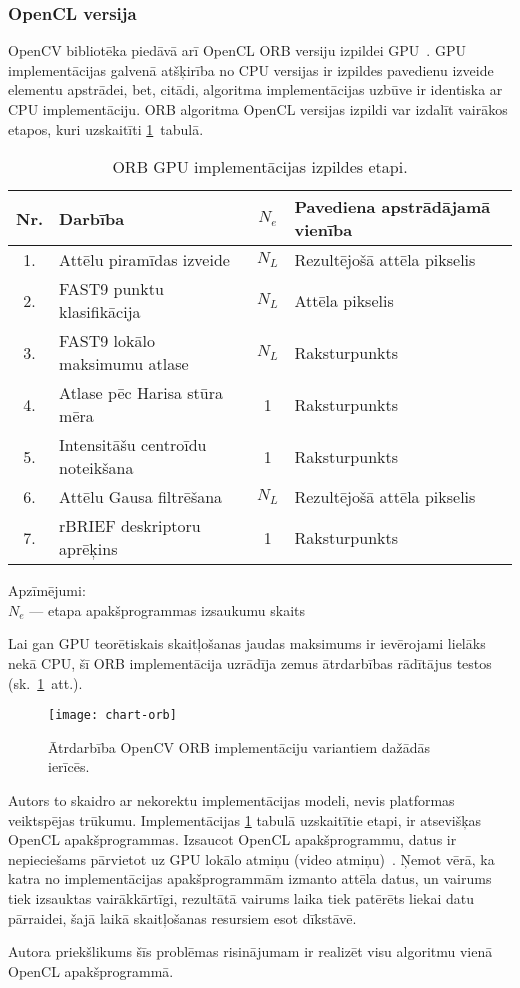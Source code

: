 \subsubsection{OpenCL versija}
\label{sec:orb-ocv-cl}
OpenCV bibliotēka piedāvā arī OpenCL ORB versiju izpildei
GPU~\cite{OpenCV-src}. GPU implementācijas galvenā atšķirība no CPU versijas 
ir izpildes pavedienu izveide elementu apstrādei, bet, citādi,
algoritma implementācijas uzbūve ir identiska ar CPU implementāciju.
ORB algoritma OpenCL versijas izpildi var izdalīt vairākos etapos, kuri
uzskaitīti \ref{tbl:orb-ocl-steps}~tabulā.
\begin{table}[thb]\small
	\centering
	\caption{ORB GPU implementācijas izpildes etapi.}
	\label{tbl:orb-ocl-steps}
	\vspace{4pt}
	\begin{tabular}{clcl}
		\toprule
		\textbf{Nr.} & \textbf{Darbība} & $N_e$ & \textbf{Pavediena apstrādājamā vienība}\\
		\midrule
		1. & Attēlu piramīdas izveide & $N_L$ & Rezultējošā attēla pikselis\\
		2. & FAST9 punktu klasifikācija & $N_L$ & Attēla pikselis\\
		3. & FAST9 lokālo maksimumu atlase & $N_L$ & Raksturpunkts\\
		4. & Atlase pēc Harisa stūra mēra & 1 & Raksturpunkts\\
		5. & Intensitāšu centroīdu noteikšana & 1 & Raksturpunkts\\
		6. & Attēlu Gausa filtrēšana & $N_L$ & Rezultējošā attēla pikselis\\
		7. & rBRIEF deskriptoru aprēķins & 1 & Raksturpunkts\\
		\bottomrule
	\end{tabular}
	\begin{minipage}{0.6\linewidth}
		\noindent Apzīmējumi:\\
		$N_e$ --- etapa apakšprogrammas izsaukumu skaits\\
	\end{minipage}
\end{table}

Lai gan GPU teorētiskais skaitļošanas jaudas maksimums ir ievērojami lielāks
nekā CPU, šī ORB implementācija uzrādīja zemus ātrdarbības rādītājus testos
(sk.~\ref{fig:test4-data-text}~att.).
\begin{figure}[tbh]
	\centering
	\texttt{[image: chart-orb]}
	\caption{Ātrdarbība OpenCV ORB implementāciju variantiem dažādās ierīcēs.}
	\label{fig:test4-data-text}
\end{figure}
Autors to skaidro ar nekorektu implementācijas modeli,
nevis platformas veiktspējas trūkumu.
Implementācijas \ref{tbl:orb-ocl-steps} tabulā uzskaitītie etapi,
ir atsevišķas OpenCL apakšprogrammas. Izsaucot OpenCL apakšprogrammu, datus
ir nepieciešams pārvietot uz GPU lokālo atmiņu (video atmiņu)~\cite{OpenCL-book}.
Ņemot vērā, ka katra no implementācijas apakšprogrammām izmanto attēla datus,
un vairums tiek izsauktas vairākkārtīgi, rezultātā vairums laika tiek patērēts
liekai datu pārraidei, šajā laikā skaitļošanas resursiem esot dīkstāvē.

Autora priekšlikums šīs problēmas risinājumam ir realizēt visu algoritmu
vienā OpenCL apakšprogrammā.


